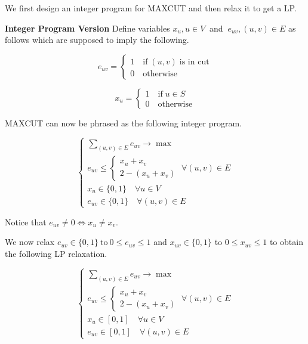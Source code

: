 \documentclass[12pt]{article}
\begin{document}
We first design an integer program for MAXCUT and then relax it to get a LP.

\textbf{Integer Program Version} Define variables $x_u, u \in V \ $ and $\ e_{uv}, (u,v) \in E$ as follows
which are supposed to imply the following.

\begin{equation}
e_{uv} =
\label{primal}
	\begin{cases}
		1 \quad  \text{if} \; (u, v) \; \text{is in cut} \\
		0 \quad \text{otherwise} 
	\end{cases}
\end{equation}

\begin{equation}
x_u =
\label{primal}
	\begin{cases}
		1 \quad  \text{if} \; u \in S\\
		0 \quad \text{otherwise} 
	\end{cases}
\end{equation}

MAXCUT can now be phrased as the following integer program.

\begin{equation}
    \begin{cases}
     \sum\limits_{(u,v) \in E} e_{uv} \longrightarrow \max \\
	
		e_{uv} \le \begin{cases}
		x_u + x_v \\
		2 - (x_u + x_v)
	\end{cases}
	\; \forall (u,v) \in E\\

	x_u \in \{0,1\} \quad \forall u \in V\\
	
	e_{uv} \in \{0,1\} \quad \forall (u,v) \in E
    \end{cases}
\end{equation}

Notice that $e_{uv} \ne 0 \Longleftrightarrow x_u \ne x_v$.

We now relax $e_{uv} \in \{0,1\} \ \text{to} \ 0 \le e_{uv} \le 1$ and $x_{uv} \in \{ 0,1\}$ to $0 \le x_{uv} \le 1$ to obtain the following LP relaxation.

\begin{equation}
    \begin{cases}
    \sum\limits_{(u,v) \in E} e_{uv} \longrightarrow \max \\
	
		e_{uv} \le \begin{cases}
		x_u + x_v \\
		2 - (x_u + x_v)
	\end{cases}
	\; \forall (u,v) \in E\\

	x_u \in [0,1] \quad \forall u \in V\\
	
	e_{uv} \in [0,1] \quad \forall (u,v) \in E
    \end{cases}
\end{equation}
\end{document}
